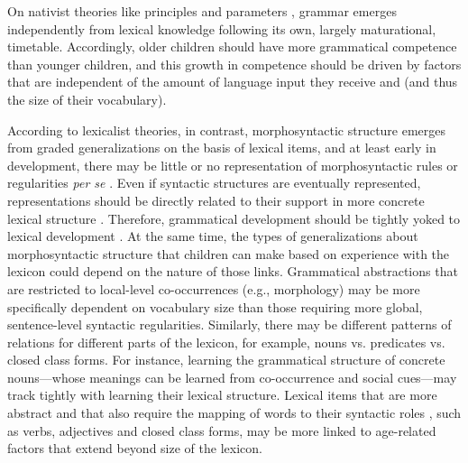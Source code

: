 \documentclass[10pt,letterpaper]{article}
\begin{document}
On nativist theories like principles and parameters \cite{chomsky1981, baker2005}, grammar emerges independently from lexical knowledge following its own, largely maturational, timetable. Accordingly, older children should have more grammatical competence than younger children, and this growth in competence should be driven by factors that are independent of the amount of language input they receive and (and thus the size of their vocabulary).

According to lexicalist theories, in contrast, morphosyntactic structure emerges from graded generalizations on the basis of lexical items, and at least early in development, there may be little or no representation of morphosyntactic rules or regularities \emph{per se} \cite{tomasello2003}. Even if syntactic structures are eventually represented, representations should be directly related to their support in more concrete lexical structure \cite{bannard2009}. Therefore, grammatical development should be tightly yoked to lexical development  \cite{bates1999}. At the same time, the types of generalizations about morphosyntactic structure that children can make based on experience with the lexicon could depend on the nature of those links. Grammatical abstractions that are restricted to local-level co-occurrences (e.g., morphology) may be more specifically dependent on vocabulary size than those requiring more global, sentence-level syntactic regularities. Similarly, there may be different patterns of relations for different parts of the lexicon, for example, nouns vs. predicates vs. closed class forms. For instance, learning the grammatical structure of concrete nouns---whose meanings can be learned from co-occurrence and social cues---may track tightly with learning their lexical structure. Lexical items that are more abstract and that also require the mapping of words to their syntactic roles \cite{gleitman1990}, such as verbs, adjectives and closed class forms, may be more linked to age-related factors that extend beyond size of the lexicon.

\end{document}
